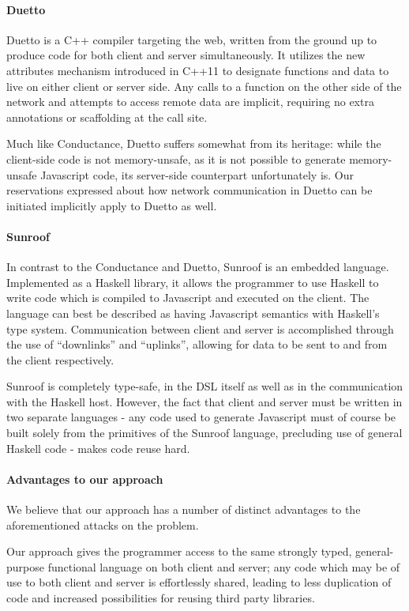 \documentclass[preprint]{sigplanconf}
\begin{document}
\paragraph{Duetto} Duetto is a C++ compiler targeting the web, written from
the ground up to produce code for both client and server simultaneously. It
utilizes the new attributes mechanism introduced in C++11 to designate
functions and data to live on either client or server side. Any calls to a
function on the other side of the network and attempts to access remote data
are implicit, requiring no extra annotations or scaffolding at the call site.

Much like Conductance, Duetto suffers somewhat from its heritage: while the
client-side code is not memory-unsafe, as it is not possible to generate
memory-unsafe Javascript code, its server-side counterpart unfortunately is.
Our reservations expressed about how network communication in Duetto can be
initiated implicitly apply to Duetto as well.

\paragraph{Sunroof} In contrast to the Conductance and Duetto, Sunroof is an
embedded language. Implemented as a Haskell library, it allows the programmer
to use Haskell to write code which is compiled to Javascript and executed on
the client. The language can best be described as having Javascript semantics
with Haskell's type system. Communication between client and server is
accomplished through the use of ``downlinks'' and ``uplinks'', allowing for
data to be sent to and from the client respectively.

Sunroof is completely type-safe, in the DSL itself as well as in the
communication with the Haskell host. However, the fact that client and server
must be written in two separate languages - any code used to generate
Javascript must of course be built solely from the primitives of the Sunroof
language, precluding use of general Haskell code - makes code reuse hard.

\paragraph{Advantages to our approach} We believe that our approach has a
number of distinct advantages to the aforementioned attacks on the problem.

Our approach gives the programmer access to the same strongly typed,
general-purpose functional language on both client and server; any code which
may be of use to both client and server is effortlessly shared, leading to less
duplication of code and increased possibilities for reusing third party
libraries.
\end{document}
